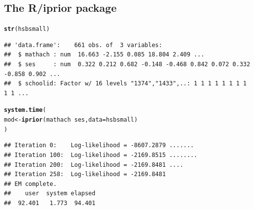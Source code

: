\documentclass{beamer}\usepackage[]{graphicx}\usepackage[]{color}
\makeatletter
\newcommand{\hlopt}[1]{\textcolor[rgb]{0,0,0}{#1}}%
\newcommand{\hlstd}[1]{\textcolor[rgb]{0.345,0.345,0.345}{#1}}%
\newcommand{\hlkwb}[1]{\textcolor[rgb]{0.69,0.353,0.396}{#1}}%
\newcommand{\hlkwc}[1]{\textcolor[rgb]{0.333,0.667,0.333}{#1}}%
\newcommand{\hlkwd}[1]{\textcolor[rgb]{0.737,0.353,0.396}{\textbf{#1}}}%
\newenvironment{kframe}{%
 \def\at@end@of@kframe{}%
 \ifinner\ifhmode%
  \def\at@end@of@kframe{\end{minipage}}%
  \begin{minipage}{\columnwidth}%
 \fi\fi%
 \def\FrameCommand##1{\hskip\@totalleftmargin \hskip-\fboxsep
 \colorbox{shadecolor}{##1}\hskip-\fboxsep
     \hskip-\linewidth \hskip-\@totalleftmargin \hskip\columnwidth}%
 \MakeFramed {\advance\hsize-\width
   \@totalleftmargin\z@ \linewidth\hsize
   \@setminipage}}%
 {\par\unskip\endMakeFramed%
 \at@end@of@kframe}
\newenvironment{knitrout}{}{} %
\makeatother
\begin{document}
\subsection{The R/iprior package}


\newsavebox{\ipriordemoa}
\begin{lrbox}{\ipriordemoa}
\begin{knitrout}\small
{}\color{fgcolor}\begin{kframe}
\begin{alltt}
\hlkwd{str}\hlstd{(hsbsmall)}
\end{alltt}
\begin{verbatim}
## 'data.frame':	661 obs. of  3 variables:
##  $ mathach : num  16.663 -2.155 0.085 18.804 2.409 ...
##  $ ses     : num  0.322 0.212 0.682 -0.148 -0.468 0.842 0.072 0.332 -0.858 0.902 ...
##  $ schoolid: Factor w/ 16 levels "1374","1433",..: 1 1 1 1 1 1 1 1 1 1 ...
\end{verbatim}
\end{kframe}
\end{knitrout}
\end{lrbox}

\newsavebox{\ipriordemob}
\begin{lrbox}{\ipriordemob}
\begin{knitrout}\small
{}\color{fgcolor}\begin{kframe}
\begin{alltt}
\hlkwd{system.time}\hlstd{(}
  \hlstd{mod} \hlkwb{<-} \hlkwd{iprior}\hlstd{(mathach} \hlopt{~} \hlstd{ses,} \hlkwc{data} \hlstd{= hsbsmall)}
\hlstd{)}
\end{alltt}
\begin{verbatim}
## Iteration 0:    Log-likelihood = -8607.2879 .......
## Iteration 100:  Log-likelihood = -2169.8515 ........
## Iteration 200:  Log-likelihood = -2169.8481 ....
## Iteration 258:  Log-likelihood = -2169.8481 
## EM complete.
##    user  system elapsed 
##  92.401   1.773  94.401
\end{verbatim}
\end{kframe}
\end{knitrout}
\end{lrbox}
\end{document}
